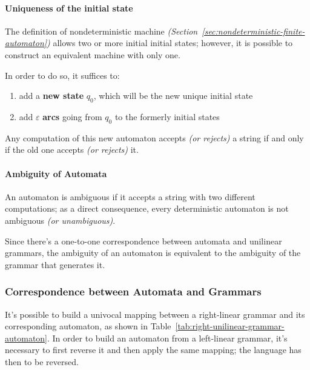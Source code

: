 \documentclass[english]{article}
\begin{document}
\paragraph{Uniqueness of the initial state}

The definition of nondeterministic machine \textit{(Section~\ref{sec:nondeterministic-finite-automaton})} allows two or more initial initial states;
however, it is possible to construct an equivalent machine with only one.

In order to do so, it suffices to:

\begin{enumerate}
  \item add a \textbf{new state} \(q_0\), which will be the new unique initial state
  \item add \(\varepsilon\) \textbf{arcs} going from \(q_0\) to the formerly initial states
\end{enumerate}

Any computation of this new automaton accepts \textit{(or rejects)} a string if and only if the old one accepts \textit{(or rejects)} it.

\paragraph{Ambiguity of Automata}

An automaton is ambiguous if it accepts a string with two different computations;
as a direct consequence, every deterministic automaton is not ambiguous \textit{(or unambiguous)}.

Since there's a one-to-one correspondence between automata and unilinear grammars, the ambiguity of an automaton is equivalent to the ambiguity of the grammar that generates it.

\subsubsection{Correspondence between Automata and Grammars}
\label{sec:correspondence-between-automata-and-grammars}

It's possible to build a univocal mapping between a right-linear grammar and its corresponding automaton, as shown in Table~\ref{tab:right-unilinear-grammar-automaton}.
In order to build an automaton from a left-linear grammar, it's necessary to first reverse it and then apply the same mapping;
the language has then to be reversed.
\end{document}
